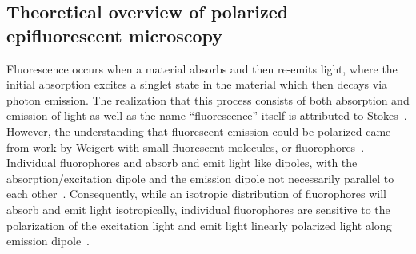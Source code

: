 \subsection{Theoretical overview of polarized epifluorescent microscopy}
Fluorescence occurs when a material absorbs and then re-emits light, where the initial absorption excites a singlet state in the material which then decays via photon emission.
The realization that this process consists of both absorption and emission of light as well as the name ``fluorescence'' itself is attributed to Stokes~\cite{RN286,RN287}.
However, the understanding that fluorescent emission could be polarized came from work by Weigert with small fluorescent molecules, or fluorophores~\cite{RN285}.
Individual fluorophores and absorb and emit light like dipoles, with the absorption/excitation dipole and the emission dipole not necessarily parallel to each other~\cite{RN282}.
Consequently, while an isotropic distribution of fluorophores will absorb and emit light isotropically, individual fluorophores are sensitive to the polarization of the excitation light and emit light linearly polarized light along emission dipole~\cite{RN282}.

